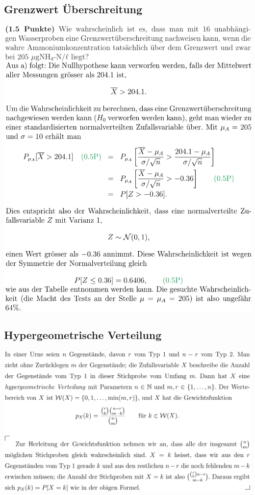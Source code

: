 \subsection{Grenzwert Überschreitung}
\includegraphics[width=\linewidth]{./Figures/Test_Ueberschreitung.png}

\subsection{Hypergeometrische Verteilung}
\includegraphics[width=\linewidth]{./Figures/Hypergeometrische_Verteilung.png}


